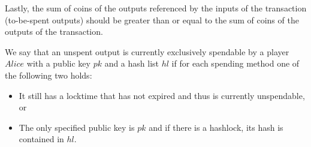 Lastly, the sum of coins of the outputs referenced by the inputs of the
transaction (to-be-spent outputs) should be greater than or equal to the sum of
coins of the outputs of the transaction.

We say that an unspent output is currently exclusively spendable by a player
$Alice$ with a public key $pk$ and a hash list $hl$ if for each spending method
one of the following two holds:
\begin{itemize}
  \item It still has a locktime that has not expired and thus is currently
  unspendable, or
  \item The only specified public key is $pk$ and if there is a hashlock, its
  hash is contained in $hl$.
\end{itemize}

